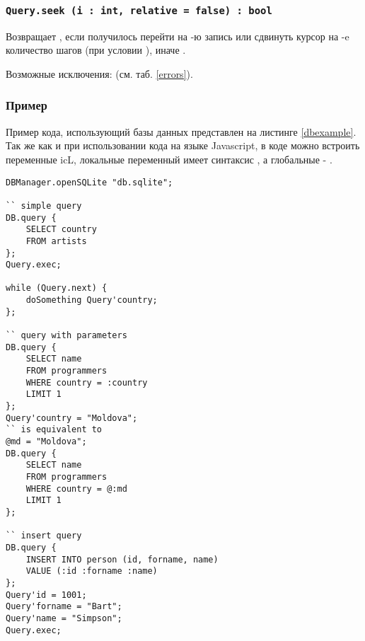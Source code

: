 \subsubsection{\lstinline|Query.seek (i : int, relative = false) : bool|}

Возвращает \true, если получилось перейти на -ю запись или сдвинуть курсор на -e количество шагов (при условии ), иначе \false.

Возможные исключения:  (см. таб. \ref{errors}).

\subsubsection{Пример}

Пример кода, использующий базы данных представлен на листинге \ref{dbexample}. Так же как и при использовании кода на языке Javascript, в коде можно встроить переменные icL, локальные переменный имеет синтаксис , а глобальные - .

\begin{lstlisting}[caption=Пример кода использующий базу данных, label=dbexample]
DBManager.openSQLite "db.sqlite";

`` simple query
DB.query {
	SELECT country
	FROM artists
};
Query.exec;

while (Query.next) {
    doSomething Query'country;
};

`` query with parameters
DB.query {
	SELECT name
	FROM programmers
	WHERE country = :country
	LIMIT 1
};
Query'country = "Moldova";
`` is equivalent to
@md = "Moldova";
DB.query {
	SELECT name
	FROM programmers
	WHERE country = @:md
	LIMIT 1
};

`` insert query
DB.query {
	INSERT INTO person (id, forname, name)
	VALUE (:id :forname :name)
};
Query'id = 1001;
Query'forname = "Bart";
Query'name = "Simpson";
Query.exec;
\end{lstlisting}

